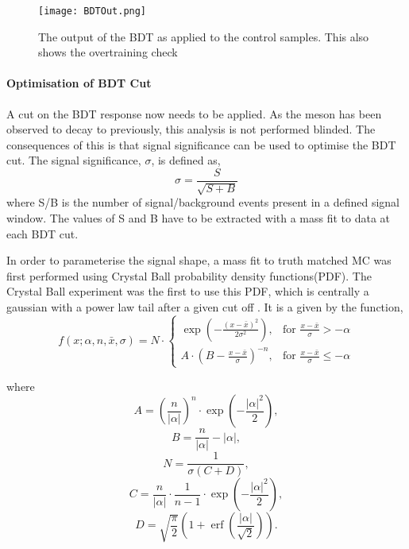 \begin{figure}[h]
  \centering
  \texttt{[image: BDTOut.png]}
  \caption{The output of the BDT as applied to the control samples.  This also shows the overtraining check}
  \label{fig:BDTOut}
\end{figure}

\clearpage
\paragraph{Optimisation of BDT Cut}
A cut on the BDT response now needs to be applied.  As the \Bd meson has been observed to decay to \Kstar \etaz previously, this analysis is not performed blinded.  The consequences of this is that signal significance can be used to optimise the BDT cut.  The signal significance, $\sigma$, is defined as,
\begin{equation}
  \sigma=\frac{S}{\sqrt{S+B}}
\end{equation}
where S/B is the number of signal/background events present in a defined signal window.  The values of S and B have to be extracted with a mass fit to data at each BDT cut.

In order to parameterise the signal shape, a mass fit to truth matched MC was first performed using Crystal Ball probability density functions(PDF).  The Crystal Ball experiment was the first to use this PDF, which is centrally a gaussian with a power law tail after a given cut off \cite{CrystallBall}.  It is a given by the function,
\begin{equation}
f(x;\alpha,n,\bar x,\sigma) = N \cdot \begin{cases} \exp(- \frac{(x - \bar x)^2}{2 \sigma^2}), & \mbox{for }\frac{x - \bar x}{\sigma} > -\alpha \\
  A \cdot (B - \frac{x - \bar x}{\sigma})^{-n}, & \mbox{for }\frac{x - \bar x}{\sigma} \leqslant -\alpha \end{cases}
\end{equation}

where
\begin{equation}
  A = \left(\frac{n}{\left| \alpha \right|}\right)^n \cdot \exp\left(- \frac {\left| \alpha \right|^2}{2}\right),
\end{equation}
\begin{equation}
  B = \frac{n}{\left| \alpha \right|}  - \left| \alpha \right|,
\end{equation}
\begin{equation}
  N = \frac{1}{\sigma (C + D)},
\end{equation}
  \begin{equation}
  C = \frac{n}{\left| \alpha \right|} \cdot \frac{1}{n-1} \cdot \exp\left(- \frac {\left| \alpha \right|^2}{2}\right),
  \end{equation}
  \begin{equation}
  D = \sqrt{\frac{\pi}{2}} \left(1 + \operatorname{erf}\left(\frac{\left| \alpha \right|}{\sqrt 2}\right)\right).
  \end{equation}

